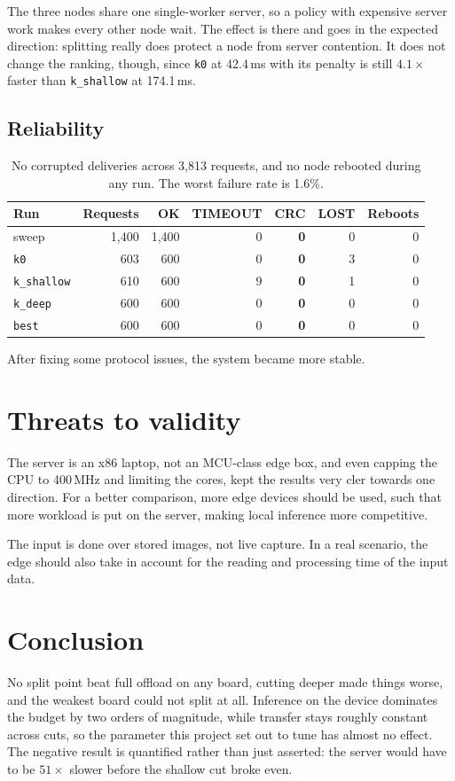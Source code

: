 \documentclass[11pt,a4paper]{article}
\begin{document}
The three nodes share one single-worker server, so a policy with expensive
server work makes every other node wait. The effect is there and goes in the
expected direction: splitting really does protect a node from server contention.
It does not change the ranking, though, since \texttt{k0} at 42.4\,ms with its
penalty is still $4.1\times$ faster than \texttt{k\_shallow} at 174.1\,ms.

\subsection{Reliability}

\begin{table}[h]
\centering
\begin{tabular}{lrrrrrr}
\toprule
Run & Requests & OK & TIMEOUT & CRC & LOST & Reboots \\
\midrule
sweep & 1{,}400 & 1{,}400 & 0 & \textbf{0} & 0 & 0 \\
\texttt{k0} & 603 & 600 & 0 & \textbf{0} & 3 & 0 \\
\texttt{k\_shallow} & 610 & 600 & 9 & \textbf{0} & 1 & 0 \\
\texttt{k\_deep} & 600 & 600 & 0 & \textbf{0} & 0 & 0 \\
\texttt{best} & 600 & 600 & 0 & \textbf{0} & 0 & 0 \\
\bottomrule
\end{tabular}
\caption{No corrupted deliveries across 3{,}813 requests, and no node rebooted
during any run. The worst failure rate is 1.6\%.}
\end{table}

After fixing some protocol issues, the system became more stable.

\section{Threats to validity}
\label{sec:threats}

The server is an x86 laptop, not an MCU-class edge box, and even capping the CPU to 400\,MHz 
and limiting the cores, kept the results very cler towards one direction. For a better comparison,
more edge devices should be used, such that more workload is put on the server, making local inference more competitive.

The input is done over stored images, not live capture. In a real scenario, the edge should also 
take in account for the reading and processing time of the input data.

\section{Conclusion}

No split point beat full offload on any board, cutting deeper made things worse,
and the weakest board could not split at all. Inference on the device dominates
the budget by two orders of magnitude, while transfer stays roughly constant
across cuts, so the parameter this project set out to tune has almost no effect.
The negative result is quantified rather than just asserted: the server would
have to be $51\times$ slower before the shallow cut broke even.
\end{document}
